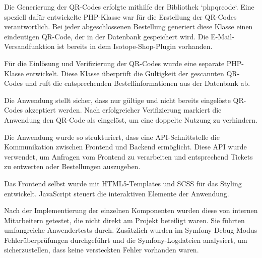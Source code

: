 Die Generierung der QR-Codes erfolgte mithilfe der Bibliothek `phpqrcode`. Eine speziell dafür entwickelte PHP-Klasse war für die Erstellung der QR-Codes verantwortlich. Bei jeder abgeschlossenen Bestellung generiert diese Klasse einen eindeutigen QR-Code, der in der Datenbank gespeichert wird. Die E-Mail-Versandfunktion ist bereits in dem Isotope-Shop-Plugin vorhanden.

Für die Einlösung und Verifizierung der QR-Codes wurde eine separate PHP-Klasse entwickelt. Diese Klasse überprüft die Gültigkeit der gescannten QR-Codes und ruft die entsprechenden Bestellinformationen aus der Datenbank ab.

Die Anwendung stellt sicher, dass nur gültige und nicht bereits eingelöste QR-Codes akzeptiert werden. Nach erfolgreicher Verifizierung markiert die Anwendung den QR-Code als eingelöst, um eine doppelte Nutzung zu verhindern.

Die Anwendung wurde so strukturiert, dass eine API-Schnittstelle die Kommunikation zwischen Frontend und Backend ermöglicht. Diese \acs{API} wurde verwendet, um Anfragen vom Frontend zu verarbeiten und entsprechend Tickets zu entwerten oder Bestellungen auszugeben. 

Das Frontend selbst wurde mit HTML5-Templates und \acs{SCSS} für das Styling entwickelt. JavaScript steuert die interaktiven Elemente der Anwendung.

Nach der Implementierung der einzelnen Komponenten wurden diese von internen Mitarbeitern getestet, die nicht direkt am Projekt beteiligt waren. Sie führten umfangreiche Anwendertests durch.
Zusätzlich wurden im Symfony-Debug-Modus Fehlerüberprüfungen durchgeführt und die Symfony-Logdateien analysiert, um sicherzustellen, dass keine versteckten Fehler vorhanden waren.

